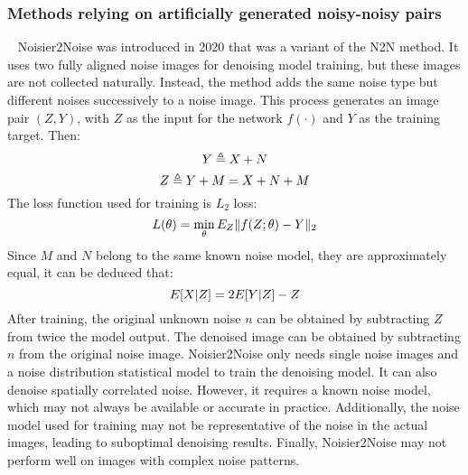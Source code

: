 \documentclass[conference]{IEEEtran}
\begin{document}
\subsubsection{Methods relying on artificially generated noisy-noisy pairs}
\
\newline
\noindent Noisier2Noise \cite{moran2020noisier2noise} was introduced in 2020 that was a variant of the N2N \cite{lehtinen2018noise2noise} method. It uses two fully aligned noise images for denoising model training, but these images are not collected naturally. Instead, the method adds the same noise type but different noises successively to a noise image.
This process generates an image pair $(Z,Y)$, with $Z$ as the input for the network $f(\cdot)$ and $Y$ as the training target. Then:
\begin{equation}
	\setlength{\abovedisplayskip}{0pt}
	\setlength{\belowdisplayskip}{0pt}
	Y \triangleq  X + N
	\label{eq:Noisier2Noise_1}
\end{equation}
\begin{equation}
	\setlength{\abovedisplayskip}{0pt}
	\setlength{\belowdisplayskip}{0pt}
	Z \triangleq  Y+M = X+N +M
	\label{eq:Noisier2Noise_2}
\end{equation}
The loss function used for training is $L_2$ loss:
\begin{equation}
	\setlength{\abovedisplayskip}{0pt}
	\setlength{\belowdisplayskip}{0pt}
	L(\theta) = \min\limits_{\theta}{E_Z \Vert f(Z;\theta) -Y\Vert_2}
	\label{eq:Noisier2Noise_3}
\end{equation}
Since $M$ and $N$ belong to the same known noise model, they are approximately equal, it can be deduced that:
\begin{equation}
	\setlength{\abovedisplayskip}{0pt}
	\setlength{\belowdisplayskip}{0pt}
	E[X|Z] = 2E[Y|Z] -Z
	\label{eq:Noisier2Noise_4}
\end{equation}
After training, the original unknown noise $n$ can be obtained by subtracting $Z$ from twice the model output. The denoised image can be obtained by subtracting $n$ from the original noise image.
Noisier2Noise only needs single noise images and a noise distribution statistical model to train the denoising model. It can also denoise spatially correlated noise. However, it requires a known noise model, which may not always be available or accurate in practice. Additionally, the noise model used for training may not be representative of the noise in the actual images, leading to suboptimal denoising results. Finally, Noisier2Noise may not perform well on images with complex noise patterns.
\end{document}
